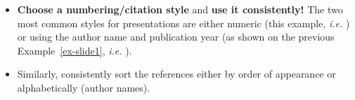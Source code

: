\documentclass[11pt,a4paper]{article}
\begin{document}
\begin{goodexample}
  \begin{figure}[H]
    \centering%
    {%
      \setlength{\fboxsep}{0pt}%
      \setlength{\fboxrule}{2pt}%
    }
  \end{figure}
  
  \begin{itemize}[leftmargin=6pt]
    \item \textbf{Choose a numbering/citation style} and \textbf{use it consistently!} The two most common styles for presentations are either numeric (this example, \emph{i.e.} \goodstyle{\scriptsize[1]}) or using the author name and publication year (as shown on the previous Example~\ref{ex-slide1}, \emph{i.e.} \goodstyle{\scriptsize[Poier'18]}).
    \item Similarly, consistently sort the references either by order of appearance or alphabetically (author names).
  \end{itemize}
\end{goodexample}
\end{document}
